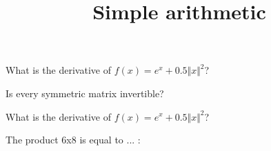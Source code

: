 \documentclass{article}
\begin{document}
\begin{category}
\begin{question}[essay]
What is the derivative of $f(x) = e^x + 0.5 \Vert x \Vert^2$?
\end{question}

\begin{question}[multichoice]
Is every symmetric matrix invertible?
\end{question}

\begin{question}[essay]
What is the derivative of $f(x) = e^x + 0.5 \Vert x \Vert^2$?
\end{question}

\begin{question}[multichoice]
    \title{Simple arithmetic}
    The product 6x8 is equal to ... :
\end{question}

\end{category}
\end{document}
